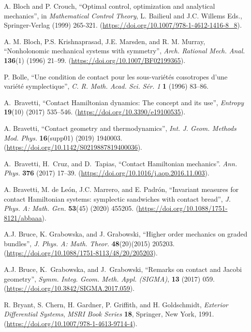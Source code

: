 \documentclass[12pt]{report}
\begin{document}
\begin{thebibliography}{999}
A. Bloch and P. Crouch,
``Optimal control, optimization and analytical mechanics'', 
in {\sl Mathematical Control Theory}, 
L. Bailieul and J.C. Willems Eds., Springer-Verlag (1999) 265-321.
(\url{https://doi.org/10.1007/978-1-4612-1416-8_8}).

A. M. Bloch, P.S. Krishnaprasad, J.E. Marsden, and R. M. Murray,
``Nonholonomic mechanical systems with symmetry'',
{\sl Arch. Rational Mech. Anal.} {\bf 136}(1) (1996) 21--99.
(\url{https://doi.org/10.1007/BF02199365}).

P. Bolle, 
``Une condition de contact pour les sous-vari\'et\'es coısotropes d’une vari\'et\'e symplectique'',
{\sl C. R. Math. Acad. Sci. S\'er. 1} {\bf 1} (1996) 83--86.

A.~Bravetti,
``Contact Hamiltonian dynamics: The concept and its use'',
{\sl Entropy} {\bf 19}(10) (2017) 535--546.
(\url{https://doi.org/10.3390/e19100535}).

A. Bravetti,
``Contact geometry and thermodynamics'',
{\sl Int. J. Geom. Methods Mod. Phys.}  {\bf 16}(supp01) (2019) 1940003.
(\url{https://doi.org/10.1142/S0219887819400036}).

A.~Bravetti, H.~Cruz, and D.~Tapias,
``Contact Hamiltonian mechanics''.
{\sl Ann. Phys.} {\bf 376} (2017) 17--39.
(\url{https://doi.org/10.1016/j.aop.2016.11.003}).

A. Bravetti, M. de Le\'on, J.C. Marrero, and E. Padr\'on,
``Invariant measures for contact Hamiltonian systems: symplectic sandwiches with contact bread'',
{\sl J. Phys. A: Math. Gen.} {\bf 53}(45)
(2020) 455205.
(\url{https://doi.org/10.1088/1751-8121/abbaaa}).

A.J. Bruce, K. Grabowska, and J. Grabowski,
``Higher order mechanics on graded bundles'',
{\sl J. Phys. A: Math. Theor.} {\bf 48}(20)(2015) 205203.
(\url{https://doi.org/10.1088/1751-8113/48/20/205203}).

A.J. {Bruce}, K.~{Grabowska}, and J.~{Grabowski},
``Remarks on contact and Jacobi geometry'',
{\sl Symm. Integ. Geom. Meth. Appl. (SIGMA)}, 
{\bf 13} (2017) 059.
(\url{https://doi.org/10.3842/SIGMA.2017.059}).

R. Bryant, S. Chern, H. Gardner, P. Griffith, and H. Goldschmidt,
\textit{Exterior Differential Systems}, 
{\sl MSRI Book Series} {\bf 18}, Springer, New York, 1991.
(\url{https://doi.org/10.1007/978-1-4613-9714-4}).


\end{thebibliography}
\end{document}
